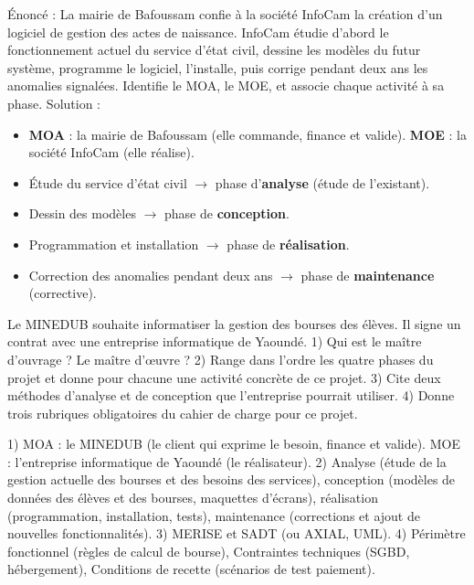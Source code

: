 \documentclass[11pt]{article}
\begin{document}
\begin{exoresolu}
Énoncé : La mairie de Bafoussam confie à la société InfoCam la création d'un logiciel de gestion des actes de naissance. InfoCam étudie d'abord le fonctionnement actuel du service d'état civil, dessine les modèles du futur système, programme le logiciel, l'installe, puis corrige pendant deux ans les anomalies signalées. Identifie le MOA, le MOE, et associe chaque activité à sa phase.
\tcblower
Solution :
\begin{itemize}
\item \textbf{MOA} : la mairie de Bafoussam (elle commande, finance et valide). \textbf{MOE} : la société InfoCam (elle réalise).
\item Étude du service d'état civil $\rightarrow$ phase d'\textbf{analyse} (étude de l'existant).
\item Dessin des modèles $\rightarrow$ phase de \textbf{conception}.
\item Programmation et installation $\rightarrow$ phase de \textbf{réalisation}.
\item Correction des anomalies pendant deux ans $\rightarrow$ phase de \textbf{maintenance} (corrective).
\end{itemize}
\end{exoresolu}

\begin{exercice}
Le MINEDUB souhaite informatiser la gestion des bourses des élèves. Il signe un contrat avec une entreprise informatique de Yaoundé. 1) Qui est le maître d'ouvrage ? Le maître d'œuvre ? 2) Range dans l'ordre les quatre phases du projet et donne pour chacune une activité concrète de ce projet. 3) Cite deux méthodes d'analyse et de conception que l'entreprise pourrait utiliser. 4) Donne trois rubriques obligatoires du cahier de charge pour ce projet.
\end{exercice}

\begin{corrige}[Exercice]
1) MOA : le MINEDUB (le client qui exprime le besoin, finance et valide). MOE : l'entreprise informatique de Yaoundé (le réalisateur). 2) Analyse (étude de la gestion actuelle des bourses et des besoins des services), conception (modèles de données des élèves et des bourses, maquettes d'écrans), réalisation (programmation, installation, tests), maintenance (corrections et ajout de nouvelles fonctionnalités). 3) MERISE et SADT (ou AXIAL, UML). 4) Périmètre fonctionnel (règles de calcul de bourse), Contraintes techniques (SGBD, hébergement), Conditions de recette (scénarios de test paiement).
\end{corrige}
\end{document}
